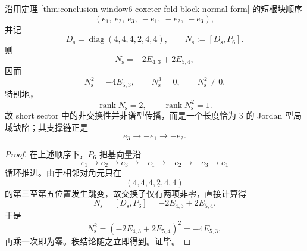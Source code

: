 \begin{proposition}[短根层缺陷的三阶幂零性]\label{prop:conclusion-window6-short-root-defect-nilpotent}
沿用定理 \ref{thm:conclusion-window6-coxeter-fold-block-normal-form} 的短根块顺序
\[
(e_1,\ e_2,\ e_3,\ -e_1,\ -e_2,\ -e_3),
\]
并记
\[
D_{\mathrm{s}}=\operatorname{diag}(4,4,4,2,4,4),
\qquad
N_{\mathrm{s}}:=[D_{\mathrm{s}},P_6].
\]
则
\[
N_{\mathrm{s}}=-2E_{4,3}+2E_{5,4},
\]
因而
\[
N_{\mathrm{s}}^2=-4E_{5,3},
\qquad
N_{\mathrm{s}}^3=0,
\qquad
N_{\mathrm{s}}^2\neq 0.
\]
特别地，
\[
\operatorname{rank}N_{\mathrm{s}}=2,
\qquad
\operatorname{rank}N_{\mathrm{s}}^2=1.
\]
故 short sector 中的非交换性并非谱型传播，而是一个长度恰为 \(3\) 的 Jordan 型局域缺陷；其支撑链正是
\[
e_3\longrightarrow -e_1\longrightarrow -e_2.
\]
\end{proposition}
\begin{proof}
在上述顺序下，\(P_6\) 把基向量沿
\[
e_1\to e_2\to e_3\to -e_1\to -e_2\to -e_3\to e_1
\]
循环推进。由于相邻对角元只在
\[
(4,4,4,\underline{2},4,4)
\]
的第三至第五位置发生跳变，故交换子仅有两项非零，直接计算得
\[
N_{\mathrm{s}}=[D_{\mathrm{s}},P_6]=-2E_{4,3}+2E_{5,4}.
\]
于是
\[
N_{\mathrm{s}}^2=(-2E_{4,3}+2E_{5,4})^2=-4E_{5,3},
\]
再乘一次即为零。秩结论随之立即得到。证毕。
\end{proof}

